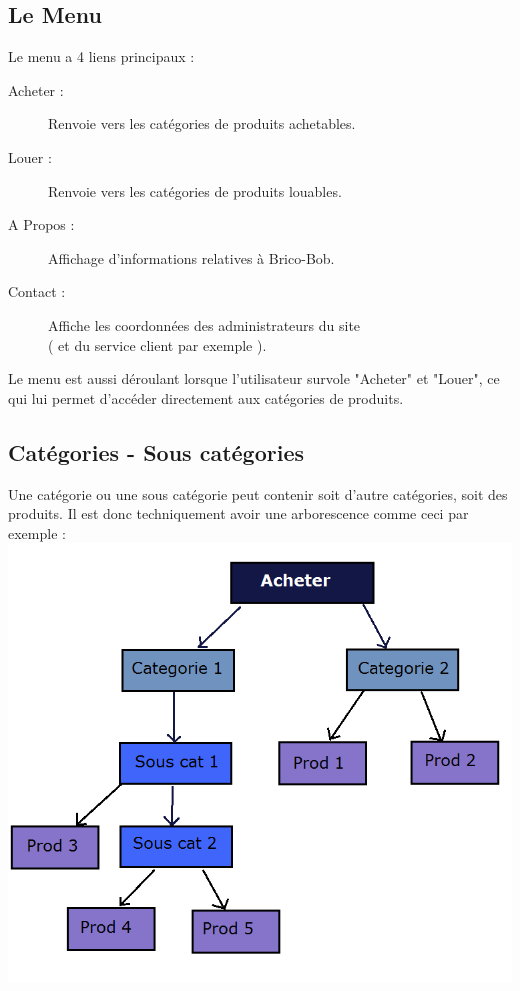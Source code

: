 

\subsection{Le Menu}

	Le menu a 4 liens principaux : 
	\begin{description}
		\item[Acheter :] Renvoie vers les catégories de produits achetables.
		\item[Louer :] Renvoie vers les catégories de produits louables.
		\item[A Propos :] Affichage d'informations relatives à Brico-Bob.
		\item[Contact :] Affiche les coordonnées des administrateurs du site\\
		 ( et du service 	client par exemple ).
	\end{description}

	Le menu est aussi déroulant lorsque l'utilisateur survole "Acheter" et "Louer", 	ce qui lui permet d'accéder directement aux catégories de produits.
	
	\subsection{Catégories - Sous catégories}

	Une catégorie ou une sous catégorie peut contenir soit d'autre catégories, 	soit des produits. Il est donc techniquement avoir une arborescence comme ceci par exemple :
\linebreak
\includegraphics[scale=0.5]{arbocatego.png}


